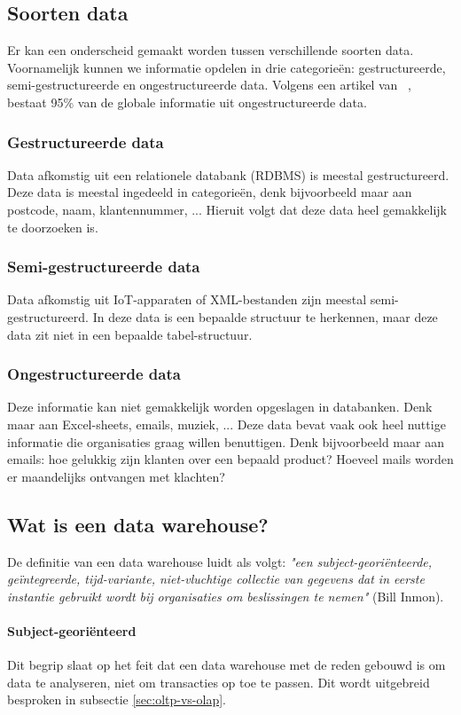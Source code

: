 \subsection{Soorten data}
Er kan een onderscheid gemaakt worden tussen verschillende soorten data. Voornamelijk kunnen we informatie opdelen in drie categorieën: gestructureerde, semi-gestructureerde en ongestructureerde data. Volgens een artikel van ~\textcite{Langseth2005}, bestaat 95\% van de globale informatie uit ongestructureerde data. 

\subsubsection{Gestructureerde data}
Data afkomstig uit een relationele databank (RDBMS) is meestal gestructureerd. Deze data is meestal ingedeeld in categorieën, denk bijvoorbeeld maar aan postcode, naam, klantennummer, ... Hieruit volgt dat deze data heel gemakkelijk te doorzoeken is. 

\subsubsection{Semi-gestructureerde data}
Data afkomstig uit IoT-apparaten of XML-bestanden zijn meestal semi-gestructureerd. In deze data is een bepaalde structuur te herkennen, maar deze data zit niet in een bepaalde tabel-structuur.

\subsubsection{Ongestructureerde data}
Deze informatie kan niet gemakkelijk worden opgeslagen in databanken. Denk maar aan Excel-sheets, emails, muziek, ... Deze data bevat vaak ook heel nuttige informatie die organisaties graag willen benuttigen. Denk bijvoorbeeld maar aan emails: hoe gelukkig zijn klanten over een bepaald product? Hoeveel mails worden er maandelijks ontvangen met klachten?

\subsection{Wat is een data warehouse?}
De definitie van een data warehouse luidt als volgt: \textit{"een subject-georiënteerde, geïntegreerde, tijd-variante, niet-vluchtige collectie van gegevens dat in eerste instantie gebruikt wordt bij organisaties om beslissingen te nemen"} (Bill Inmon).

\paragraph{Subject-georiënteerd}
Dit begrip slaat op het feit dat een data warehouse met de reden gebouwd is om data te analyseren, niet om transacties op toe te passen. Dit wordt uitgebreid besproken in subsectie \ref{sec:oltp-vs-olap}.



